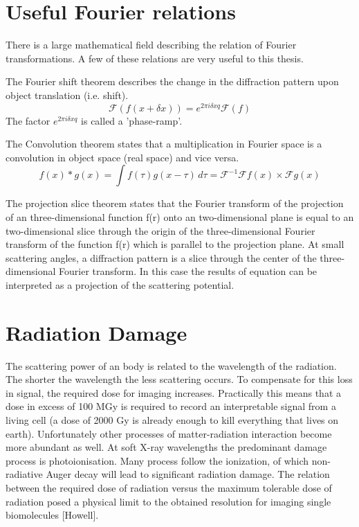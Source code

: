 \section{Useful Fourier relations}
There is a large mathematical field describing the relation of Fourier transformations. A few of these relations are very useful to this thesis.

The Fourier shift theorem describes the change in the diffraction pattern upon object translation (i.e. shift).
\begin{equation}
\mathcal{F}(f(x+\delta x))=e^{2\pi i \delta x q} \mathcal{F}(f)
\end{equation}
The factor $e^{2 \pi i \delta x q}$ is called a 'phase-ramp'.

The Convolution theorem states that a multiplication in Fourier space is a convolution in object space (real space) and vice versa.
\begin{equation}
f(x) * g(x) = \int f(\tau)g(x-\tau)\,d\tau = \mathcal{F}^{-1} {\mathcal{F}f(x)\times\mathcal{F}g(x)}
\end{equation}

The projection slice theorem states that the Fourier transform of the projection of an three-dimensional function f(r) onto an two-dimensional plane is equal to an two-dimensional slice through the origin of the three-dimensional Fourier transform of the function f(r)
which is parallel to the projection plane. At small scattering angles, a diffraction pattern is a slice through the center of the three-dimensional Fourier transform. In this case the results of equation can be interpreted as a projection of the scattering potential. 

\section{Radiation Damage}
The scattering power of an body is related to the wavelength of the radiation. The shorter the wavelength the less scattering occurs. To compensate for this loss in signal, the required dose for imaging increases. Practically this means that a dose in excess of 100 MGy is required to record an interpretable signal from a living cell (a dose of 2000 Gy is already enough to kill everything that lives on earth). Unfortunately other processes of matter-radiation interaction become more abundant as well. At soft X-ray wavelengths the predominant damage process is photoionisation. Many process follow the ionization, of which non-radiative Auger decay will lead to significant radiation damage. The relation between the required dose of radiation versus the maximum tolerable dose of radiation posed a physical limit to the obtained resolution for imaging single biomolecules [Howell].

